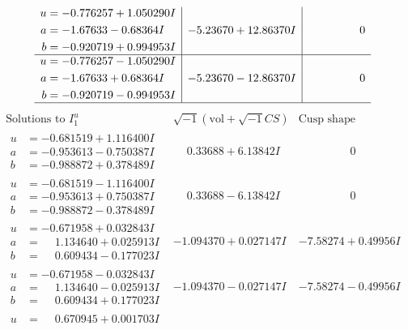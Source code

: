 \documentclass[1p]{elsarticle_modified}
\theoremstyle{definition}
\newcommand{\I}{\sqrt{-1}}
\begin{document}
$$\begin{array}{c|c|c}
\begin{aligned}
u &= -0.776257 + 1.050290 I \\
a &= -1.67633 - 0.68364 I \\
b &= -0.920719 + 0.994953 I\end{aligned}
 & -5.23670 + 12.86370 I & \phantom{-0.000000 } 0 \\ \hline\begin{aligned}
u &= -0.776257 - 1.050290 I \\
a &= -1.67633 + 0.68364 I \\
b &= -0.920719 - 0.994953 I\end{aligned}
 & -5.23670 - 12.86370 I & \phantom{-0.000000 } 0\\
 \hline 
 \end{array}$$\newpage$$\begin{array}{c|c|c}  
\text{Solutions to }I^u_{1}& \I (\text{vol} + \sqrt{-1}CS) & \text{Cusp shape}\\
 \hline 
\begin{aligned}
u &= -0.681519 + 1.116400 I \\
a &= -0.953613 - 0.750387 I \\
b &= -0.988872 + 0.378489 I\end{aligned}
 & \phantom{-}0.33688 + 6.13842 I & \phantom{-0.000000 } 0 \\ \hline\begin{aligned}
u &= -0.681519 - 1.116400 I \\
a &= -0.953613 + 0.750387 I \\
b &= -0.988872 - 0.378489 I\end{aligned}
 & \phantom{-}0.33688 - 6.13842 I & \phantom{-0.000000 } 0 \\ \hline\begin{aligned}
u &= -0.671958 + 0.032843 I \\
a &= \phantom{-}1.134640 + 0.025913 I \\
b &= \phantom{-}0.609434 - 0.177023 I\end{aligned}
 & -1.094370 + 0.027147 I & -7.58274 + 0.49956 I \\ \hline\begin{aligned}
u &= -0.671958 - 0.032843 I \\
a &= \phantom{-}1.134640 - 0.025913 I \\
b &= \phantom{-}0.609434 + 0.177023 I\end{aligned}
 & -1.094370 - 0.027147 I & -7.58274 - 0.49956 I \\ \hline\begin{aligned}
u &= \phantom{-}0.670945 + 0.001703 I \\

\end{aligned}
\end{array}$$
\end{document}
